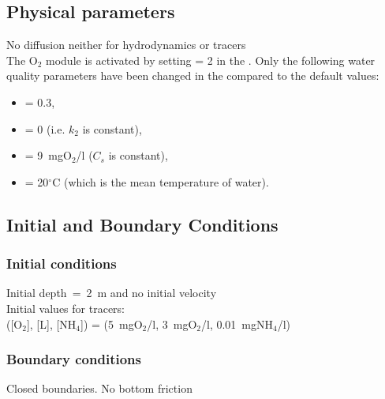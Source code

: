 \subsection{Physical parameters}
%
No diffusion neither for hydrodynamics or tracers\\
%
The O$_2$ module is activated by setting  = 2
in the  .
%
Only the following water quality parameters have been changed
in the \waqtel {} compared to the default values:
\begin{itemize}
\item {} = 0.3,
\item {} = 0 (i.e. $k_2$ is constant),
\item {} = 9~mgO$_2$/l ($C_s$ is constant),
\item {} = 20$^\circ$C (which is the mean temperature of water).
\end{itemize}
%
%
%
%
%
%
\subsection{Initial and Boundary Conditions}
%
\subsubsection{Initial conditions}
%
Initial depth~=~2~m
and no initial velocity\\
Initial values for tracers:\\
([O$_2$], [L], [NH$_4$]) =
(5~mgO$_2$/l, 3~mgO$_2$/l, 0.01~mgNH$_4$/l)
%
\subsubsection{Boundary conditions}
%
Closed boundaries. No bottom friction
%
